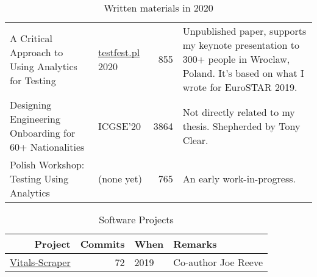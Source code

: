 \begin{table}[htpb]
\begin{tabular}{p{4.3cm}|p{1.9cm}|r|p{4.7cm}}
     A Critical Approach to Using Analytics for Testing &\href{http://testfest.pl/}{testfest.pl} 2020 &855 &Unpublished paper, supports my keynote presentation to 300+ people in Wroclaw, Poland. It's based on what I wrote for EuroSTAR 2019.\\
     
     Designing Engineering Onboarding for 60+ Nationalities &ICGSE'20 &3864 &Not directly related to my thesis. Shepherded by Tony Clear. \\
     
     Polish Workshop: Testing Using Analytics &(none yet) &765 &An early work-in-progress.\\

    \end{tabular}
    \caption{Written materials in 2020}
    \label{tab:written_materials_in_2020}
\end{table}

\begin{table}[htpb]
    \centering
    \footnotesize
    \begin{tabular}{r|r|l|l}
    Project &Commits  &When &Remarks\\
     \hline
    \href{https://github.com/commercetest/vitals-scraper/}{Vitals-Scraper} &72 &2019 &Co-author Joe Reeve \\
    
    \end{tabular}
    \caption{Software Projects}
    \label{tab:software}
\end{table}
